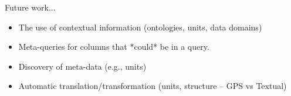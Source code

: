 Future work...

\begin{itemize}
  \item The use of contextual information (ontologies, units, data domains)


  \item Meta-queries for columns that *could* be in a query.
  \item Discovery of meta-data (e.g., units)
  \item Automatic translation/transformation (units, structure -- GPS vs Textual)
\end{itemize}